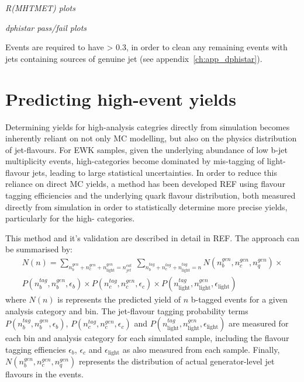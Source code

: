 \emph{R(MHTMET) plots}

\emph{dphistar pass/fail plots}

Events are required to have \dphistar > 0.3, in
order to clean any remaining events with jets containing sources of genuine \met jet (see
appendix~\ref{ch:app_dphistar}).


\section{Predicting high-\nb event yields}
\label{sec:formula_method}

Determining yields for high-\nb analysis categries directly from simulation
becomes
inherently reliant on not only MC modelling, but also on the physics
distribution of jet-flavours. For EWK samples, given the underlying abundance of
low b-jet multiplicity events, high-\nb categories become dominated by
mis-tagging of light-flavour jets, leading to large statistical uncertainties.
In order to reduce this reliance on direct MC yields, a method has been
developed REF using flavour tagging efficiencies and the underlying quark
flavour distribution, both measured directly from simulation in order to
statistically determine more precise yields, particularly for the high-\nb
categories.

This method and it's validation are described in detail in REF. The approach can
be summarised by:
% 
\begin{equation}
\begin{split}
N(n) = \sum_{n_b^{gen} + n_c^{gen} + n_{\text{light}}^{gen} = n_{jet}^{cat}}\:
\sum_{n_b^{tag} + n_c^{tag} + n_{\text{light}}^{tag} = n}
N(n_b^{gen}, n_c^{gen}, n_q^{gen}) \times \\
P(n_b^{tag}, n_b^{gen}, \epsilon_{b}) \times
P(n_c^{tag}, n_c^{gen}, \epsilon_{c}) \times
P(n_{\text{light}}^{tag}, n_{\text{light}}^{gen}, \epsilon_{\text{light}})
\end{split}
\end{equation}
% 
where $N(n)$ is represents the predicted yield of $n$ b-tagged events for a
given
analysis category and \HT bin. The jet-flavour tagging probability
terms $P(n_b^{tag}, n_b^{gen}, \epsilon_{b})$,
$P(n_c^{tag}, n_c^{gen}, \epsilon_{c})$ and 
$P(n_{\text{light}}^{tag}, n_{\text{light}}^{gen}, \epsilon_{\text{light}})$ are measured for each \HT bin and
analysis category for each simulated sample, including the flavour tagging
effiencies $\epsilon_b$, $\epsilon_c$ and $\epsilon_{\text{light}}$ as also measured from
each sample. Finally, $N(n_b^{gen}, n_c^{gen}, n_q^{gen})$ represents the
distribution of actual generator-level jet flavours in the events.

